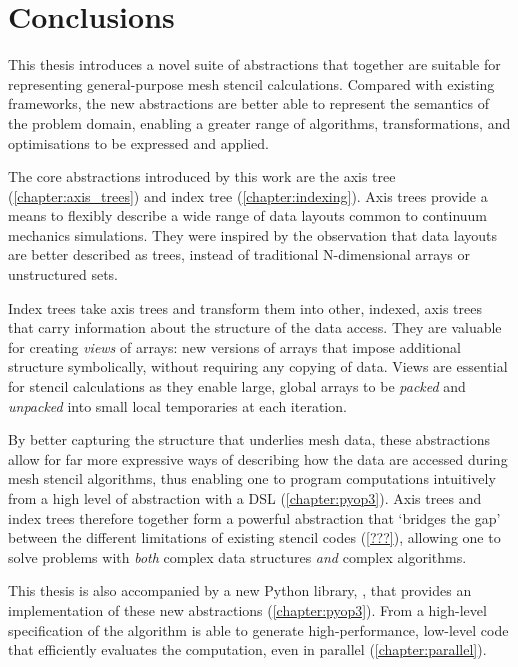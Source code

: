 \documentclass[thesis]{subfiles}
\begin{document}
\chapter{Conclusions}
\label{chapter:conclusions}

This thesis introduces a novel suite of abstractions that together are suitable for representing general-purpose mesh stencil calculations.
Compared with existing frameworks, the new abstractions are better able to represent the semantics of the problem domain, enabling a greater range of algorithms, transformations, and optimisations to be expressed and applied.

The core abstractions introduced by this work are the axis tree (\cref{chapter:axis_trees}) and index tree (\cref{chapter:indexing}).
Axis trees provide a means to flexibly describe a wide range of data layouts common to continuum mechanics simulations.
They were inspired by the observation that data layouts are better described as trees, instead of traditional N-dimensional arrays or unstructured sets.

Index trees take axis trees and transform them into other, indexed, axis trees that carry information about the structure of the data access.
They are valuable for creating \emph{views} of arrays: new versions of arrays that impose additional structure symbolically, without requiring any copying of data.
Views are essential for stencil calculations as they enable large, global arrays to be \emph{packed} and \emph{unpacked} into small local temporaries at each iteration.

By better capturing the structure that underlies mesh data, these abstractions allow for far more expressive ways of describing how the data are accessed during mesh stencil algorithms, thus enabling one to program computations intuitively from a high level of abstraction with a DSL (\cref{chapter:pyop3}).
Axis trees and index trees therefore together form a powerful abstraction that `bridges the gap' between the different limitations of existing stencil codes (\cref{???}), allowing one to solve problems with \emph{both} complex data structures \emph{and} complex algorithms.

This thesis is also accompanied by a new Python library, , that provides an implementation of these new abstractions (\cref{chapter:pyop3}).
From a high-level specification of the algorithm  is able to generate high-performance, low-level code that efficiently evaluates the computation, even in parallel (\cref{chapter:parallel}).
\end{document}
